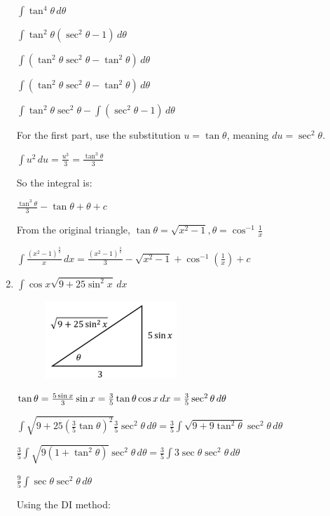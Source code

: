 \documentclass[../main.tex]{subfiles}
\begin{document}
\begin{enumerate}
    \(\int \tan^4{\theta}\,d\theta\)

    \(\int \tan^2{\theta}(\sec^2{\theta}-1)\,d\theta\)

    \(\int (\tan^2{\theta}\sec^2{\theta}-\tan^2{\theta})\,d\theta\)

    \(\int (\tan^2{\theta}\sec^2{\theta}-\tan^2{\theta})\,d\theta\)

    \(\int \tan^2{\theta}\sec^2{\theta}-\int (\sec^2{\theta}-1)\,d\theta\)

    For the first part, use the substitution \(u=\tan{\theta}\), meaning \(du=\sec^2{\theta}\).

    \(\int u^2\,du=\frac{u^3}{3}=\frac{\tan^3{\theta}}{3}\)

    So the integral is:

    \(\frac{\tan^3{\theta}}{3}-\tan{\theta}+\theta+c\)

    From the original triangle, \(\tan{\theta}=\sqrt{x^2-1}, \theta=\cos^{-1}{\frac{1}{x}}\)

    \(\int \frac{(x^2-1)^{\frac{3}{2}}}{x}\,dx=\frac{(x^2-1)^{\frac{3}{2}}}{3}-\sqrt{x^2-1}+\cos^{-1}{(\frac{1}{x})}+c\)

    \item 
    \(\int \cos{x}\sqrt{9+25\sin^2{x}}\,dx\)
    \begin{figure}[h]
        \includegraphics{images/trigsuba11.png}
    \end{figure}

    \(\tan{\theta}=\frac{5\sin{x}}{3}\\
    \sin{x}=\frac{3}{5}\tan{\theta}\\
    \cos{x}\,dx=\frac{3}{5}\sec^2{\theta}\,d\theta\)

    \(\int \sqrt{9+25(\frac{3}{5}\tan{\theta})^2}\frac{3}{5}\sec^2{\theta}\,d\theta=\frac{3}{5}\int \sqrt{9+9\tan^2{\theta}}\sec^2{\theta}\,d\theta\)

    \(\frac{3}{5}\int \sqrt{9(1+\tan^2{\theta})}\sec^2{\theta}\,d\theta=\frac{3}{5}\int 3\sec{\theta}\sec^2{\theta}\,d\theta\)

    \(\frac{9}{5}\int \sec{\theta}\sec^2{\theta}\,d\theta\)

    Using the DI method:


\end{enumerate}
\end{document}
